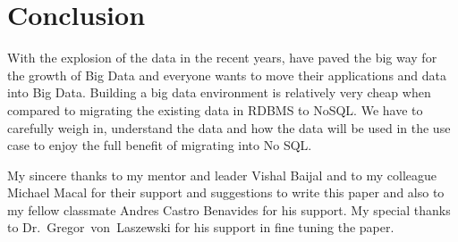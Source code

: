 \section{Conclusion}

With the explosion of the data in the recent years, have paved the
big way for the growth of Big Data and everyone wants to move their
applications and data into Big Data. Building a big data environment
is relatively very cheap when compared to migrating the existing data
in RDBMS to NoSQL. We have to carefully weigh in, understand the data
and how the data will be used in the use case to enjoy the full 
benefit of migrating into No SQL.

\begin{acks}

My sincere thanks to my mentor and leader Vishal Baijal and to my colleague
Michael Macal for their support and suggestions to write this paper and also
to my fellow classmate Andres Castro Benavides for his support. My special 
thanks to Dr.~Gregor~von~Laszewski for his support in fine tuning the paper.

\end{acks}


 


